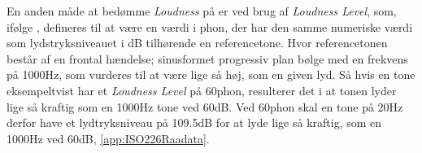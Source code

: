 \blankline
En anden måde at bedømme \textit{Loudness} på er ved brug af \textit{Loudness Level}, som, ifølge \textcite[s. 2]{STD:ISO226}, defineres til at være en værdi i phon, der har den samme numeriske værdi som lydstryksniveauet i dB tilhørende en referencetone. Hvor referencetonen består af en frontal hændelse; sinusformet progressiv plan bølge med en frekvens på 1000Hz, som vurderes til at være lige så høj, som en given lyd. Så hvis en tone eksempeltvist har et \textit{Loudness Level} på 60phon, resulterer det i at tonen lyder lige så kraftig som en 1000Hz tone ved 60dB. Ved 60phon skal en tone på 20Hz derfor have et lydtryksniveau på 109.5dB for at lyde lige så kraftig, som en 1000Hz ved 60dB, \autoref{app:ISO226Raadata}.
%

